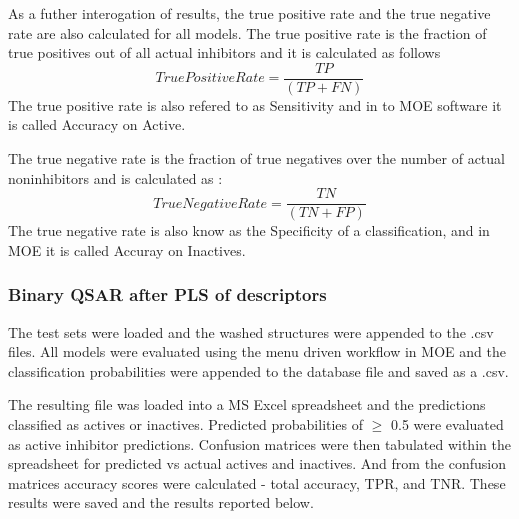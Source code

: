 As a futher interogation of results, the true positive rate and the true negative rate are also calculated for all models. The true positive rate is the fraction of true positives out of all actual inhibitors and it is calculated as follows 
$$ True Positive Rate = \frac{TP}{(TP + FN)} $$
The true positive rate is also refered to as Sensitivity and in to MOE software it is called Accuracy on Active.

The true negative rate is the fraction of true negatives over the number of actual noninhibitors and is calculated as :
$$ True Negative Rate =\frac{ TN }{(TN + FP)} $$
The true negative rate is also know as the Specificity of a classification, and in MOE it is called Accuray on Inactives.






\subsubsection{Binary QSAR after PLS of descriptors}
The test sets were loaded and the washed structures were appended to the .csv files. All models were evaluated using the menu driven workflow in MOE and the classification probabilities were appended to the database file and saved as a .csv.  

The resulting file was loaded into a MS Excel spreadsheet and the predictions classified as actives or inactives. Predicted probabilities of $\geq$ 0.5 were evaluated as active inhibitor predictions. Confusion matrices were then tabulated within the spreadsheet for predicted vs actual actives and inactives. And from the confusion matrices accuracy scores were calculated - total accuracy, TPR, and TNR. These results were saved and the results reported below.

